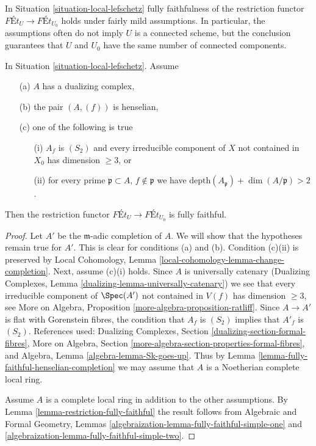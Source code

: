 \noindent
In Situation \ref{situation-local-lefschetz}
fully faithfulness of the restriction functor
$\textit{F\'Et}_U \longrightarrow \textit{F\'Et}_{U_0}$
holds under fairly mild assumptions.
In particular, the assumptions often do not imply
$U$ is a connected scheme, but the conclusion guarantees
that $U$ and $U_0$ have the same number of connected components.

\begin{lemma}
\label{lemma-fully-faithful-simple}
In Situation \ref{situation-local-lefschetz}. Assume
\begin{enumerate}
\item[(a)] $A$ has a dualizing complex,
\item[(b)] the pair $(A, (f))$ is henselian,
\item[(c)] one of the following is true
\begin{enumerate}
\item[(i)] $A_f$ is $(S_2)$ and every irreducible component of $X$
not contained in $X_0$ has dimension $\geq 3$, or
\item[(ii)] for every prime
$\mathfrak p \subset A$, $f \not \in \mathfrak p$ we have
$\text{depth}(A_\mathfrak p) + \dim(A/\mathfrak p) > 2$.
\end{enumerate}
\end{enumerate}
Then the restriction functor
$\textit{F\'Et}_U \longrightarrow \textit{F\'Et}_{U_0}$
is fully faithful.
\end{lemma}

\begin{proof}
Let $A'$ be the $\mathfrak m$-adic completion of $A$. We will show that
the hypotheses remain true for $A'$. This is clear for conditions
(a) and (b). Condition (c)(ii) is preserved by
Local Cohomology, Lemma \ref{local-cohomology-lemma-change-completion}.
Next, assume (c)(i) holds. Since $A$ is universally catenary
(Dualizing Complexes, Lemma \ref{dualizing-lemma-universally-catenary})
we see that every irreducible component of $\Spec(A')$ not contained in $V(f)$
has dimension $\geq 3$, see
More on Algebra, Proposition \ref{more-algebra-proposition-ratliff}.
Since $A \to A'$ is flat with Gorenstein fibres,
the condition that $A_f$ is $(S_2)$ implies that $A'_f$ is $(S_2)$.
References used:
Dualizing Complexes, Section \ref{dualizing-section-formal-fibres},
More on Algebra, Section \ref{more-algebra-section-properties-formal-fibres},
and Algebra, Lemma \ref{algebra-lemma-Sk-goes-up}.
Thus by Lemma \ref{lemma-fully-faithful-henselian-completion}
we may assume that $A$ is a Noetherian complete local ring.

\medskip\noindent
Assume $A$ is a complete local ring in addition to the other assumptions.
By Lemma \ref{lemma-restriction-fully-faithful} the result follows from
Algebraic and Formal Geometry, Lemmas
\ref{algebraization-lemma-fully-faithful-simple-one} and
\ref{algebraization-lemma-fully-faithful-simple-two}.
\end{proof}

